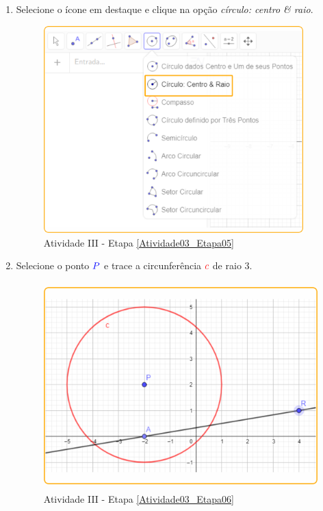\documentclass[11pt,a4paper]{article}
\begin{document}
\begin{enumerate}[{Etapa} 1.]
\item Selecione o ícone em destaque e clique na opção {\it círculo: centro \& raio}. \label{Atividade03_Etapa05}
\begin{figure}[H]
    \centering
    \includegraphics[height=8cm]{Figuras/T01_Elemento07.png}
    \caption{Atividade III - Etapa \ref{Atividade03_Etapa05}}
    \label{Atividade03_Etapa05_Imagem}
\end{figure}

\item Selecione o ponto ${\color{blue}{P}}$ e trace a circunferência ${\color{red}{c}}$ de raio $3$. \label{Atividade03_Etapa06}
\begin{figure}[H]
    \centering
    \includegraphics[height=8cm]{Figuras/T01_Atividade02_Fig03.png}
    \caption{Atividade III - Etapa \ref{Atividade03_Etapa06}}
    \label{Atividade03_Etapa06_Imagem}
\end{figure}


\end{enumerate}
\end{document}
